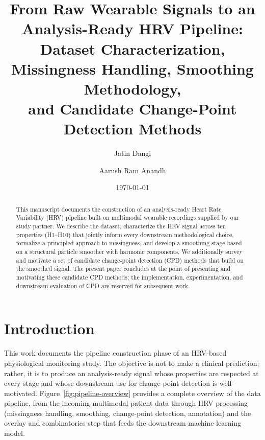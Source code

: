 \documentclass[11pt, a4paper]{article}
\title{\textbf{From Raw Wearable Signals to an Analysis-Ready HRV Pipeline:\\
Dataset Characterization, Missingness Handling, Smoothing Methodology,\\
and Candidate Change-Point Detection Methods}}
\author[1]{Jatin Dangi}
\author[1]{Aarush Ram Anandh}
\affil[1]{Koita Centre for Digital Health (KCDH)}
\date{\today}
\theoremstyle{plain}
\theoremstyle{definition}
\begin{document}
\maketitle

\begin{abstract}
This manuscript documents the construction of an analysis-ready Heart Rate
Variability (HRV) pipeline built on multimodal wearable recordings supplied
by our study partner. We describe the dataset, characterize the HRV signal
across ten properties (H1--H10) that jointly inform every downstream
methodological choice, formalize a principled approach to missingness, and
develop a smoothing stage based on a structural particle smoother with
harmonic components. We additionally survey and motivate a set of candidate
change-point detection (CPD) methods that build on the smoothed signal. The
present paper concludes at the point of presenting and motivating these
candidate CPD methods; the implementation, experimentation, and downstream
evaluation of CPD are reserved for subsequent work.
\end{abstract}

\tableofcontents
\newpage

\section{Introduction}

This work documents the pipeline construction phase of an HRV-based
physiological monitoring study. The objective is not to make a clinical
prediction; rather, it is to produce an analysis-ready signal whose
properties are respected at every stage and whose downstream use for
change-point detection is well-motivated. Figure~\ref{fig:pipeline-overview}
provides a complete overview of the data pipeline, from the incoming
multimodal patient data through HRV processing (missingness handling,
smoothing, change-point detection, annotation) and the overlay and
combinatorics step that feeds the downstream machine learning model.
\end{document}
